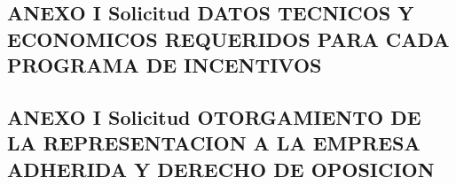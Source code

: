\documentclass{article}
\begin{document}
\subsection{ANEXO I Solicitud DATOS TECNICOS Y ECONOMICOS REQUERIDOS PARA CADA PROGRAMA DE INCENTIVOS}


\subsection{ANEXO I Solicitud OTORGAMIENTO DE LA REPRESENTACION A LA EMPRESA ADHERIDA Y DERECHO DE OPOSICION}

\end{document}
